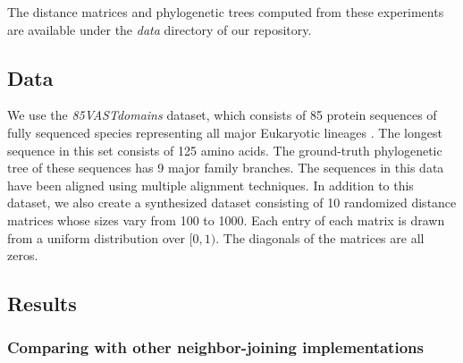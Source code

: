 \documentclass[11pt,letterpaper]{article}
\theoremstyle{definition}
\begin{document}



The distance matrices and phylogenetic trees computed from these experiments are available under the \textit{data} directory of our repository. 

\subsection{Data}

We use the \textit{85VASTdomains} dataset, which consists of 85 protein sequences of fully sequenced species representing all major Eukaryotic lineages \cite{khafif2014identification}. The longest sequence in this set consists of 125 amino acids. The ground-truth phylogenetic tree of these sequences has 9 major family branches. The sequences in this data have been aligned using multiple alignment techniques. In addition to this dataset, we also create a synthesized dataset consisting of 10 randomized distance matrices whose sizes vary from 100 to 1000. Each entry of each matrix is drawn from a uniform distribution over $[0, 1)$. The diagonals of the matrices are all zeros.   

\subsection{Results}

\subsubsection{Comparing with other neighbor-joining implementations}
\end{document}
